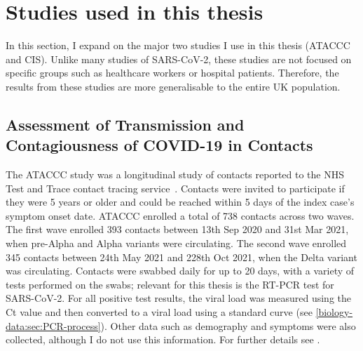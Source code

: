 \documentclass[thesis.tex]{subfiles}
\begin{document}


\section{Studies used in this thesis} \label{biology-data:sec:studies}

In this section, I expand on the major two studies I use in this thesis (ATACCC and CIS).
Unlike many studies of SARS-CoV-2, these studies are not focused on specific groups such as healthcare workers or hospital patients.
Therefore, the results from these studies are more generalisable to the entire UK population.


\subsection{Assessment of Transmission and Contagiousness of COVID-19 in Contacts} \label{biology-data:sec:ataccc}

The ATACCC study was a longitudinal study of contacts reported to the NHS Test and Trace contact tracing service~\autocite{hakkiOnset}.
Contacts were invited to participate if they were 5 years or older and  could be reached within 5 days of the index case's symptom onset date.
ATACCC enrolled a total of 738 contacts across two waves.
The first wave enrolled 393 contacts between 13th Sep 2020 and 31st Mar 2021, when pre-Alpha and Alpha variants were circulating.
The second wave enrolled 345 contacts between 24th May 2021 and 228th Oct 2021, when the Delta variant was circulating.
Contacts were swabbed daily for up to 20 days, with a variety of tests performed on the swabs; relevant for this thesis is the RT-PCR test for SARS-CoV-2.
For all positive test results, the viral load was measured using the Ct value and then converted to a viral load using a standard curve (see \cref{biology-data:sec:PCR-process}).
Other data such as demography and symptoms were also collected, although I do not use this information.
For further details see \textcite{singanayagamDuration,hakkiOnset}.
\end{document}
